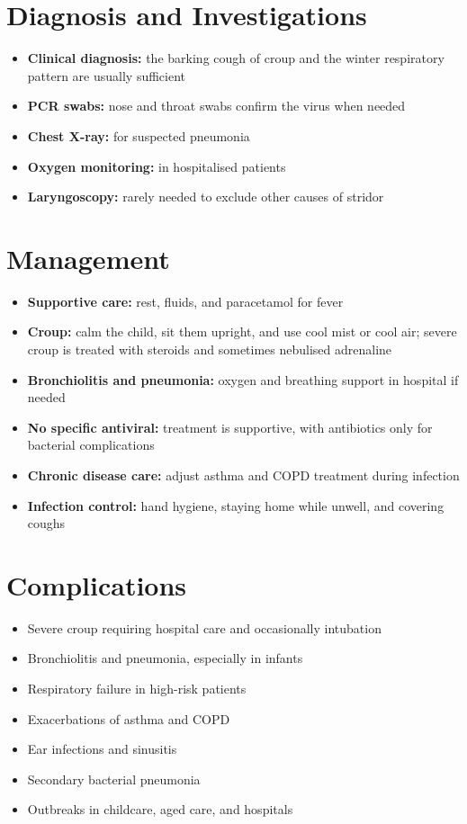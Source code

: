 \section*{Diagnosis and Investigations}
\begin{itemize}
    \item \textbf{Clinical diagnosis:} the barking cough of croup and the winter respiratory pattern are usually sufficient
    \item \textbf{PCR swabs:} nose and throat swabs confirm the virus when needed
    \item \textbf{Chest X-ray:} for suspected pneumonia
    \item \textbf{Oxygen monitoring:} in hospitalised patients
    \item \textbf{Laryngoscopy:} rarely needed to exclude other causes of stridor
\end{itemize}

\section*{Management}
\begin{itemize}
    \item \textbf{Supportive care:} rest, fluids, and paracetamol for fever
    \item \textbf{Croup:} calm the child, sit them upright, and use cool mist or cool air; severe croup is treated with steroids and sometimes nebulised adrenaline
    \item \textbf{Bronchiolitis and pneumonia:} oxygen and breathing support in hospital if needed
    \item \textbf{No specific antiviral:} treatment is supportive, with antibiotics only for bacterial complications
    \item \textbf{Chronic disease care:} adjust asthma and COPD treatment during infection
    \item \textbf{Infection control:} hand hygiene, staying home while unwell, and covering coughs
\end{itemize}

\section*{Complications}
\begin{itemize}
    \item Severe croup requiring hospital care and occasionally intubation
    \item Bronchiolitis and pneumonia, especially in infants
    \item Respiratory failure in high-risk patients
    \item Exacerbations of asthma and COPD
    \item Ear infections and sinusitis
    \item Secondary bacterial pneumonia
    \item Outbreaks in childcare, aged care, and hospitals
\end{itemize}


